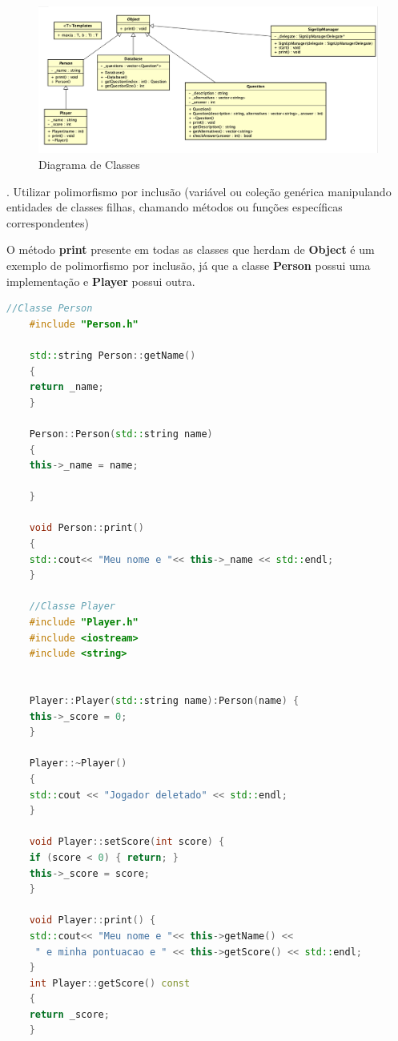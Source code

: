 \documentclass[rel_mlp]{iiufrgs}
\begin{document}
\begin{itemize}
	\begin{figure}[h!]
		\includegraphics[width=\linewidth]{dc.png}
		\caption{Diagrama de Classes}
		\label{fig:dc}
	\end{figure}
	
	. Utilizar polimorfismo por inclusão (variável ou coleção genérica manipulando entidades de classes filhas, chamando métodos ou funções específicas correspondentes)
	
	O método \textbf{print} presente em todas as classes que herdam de \textbf{Object} é um exemplo de polimorfismo por inclusão, já que a classe \textbf{Person} possui uma implementação e \textbf{Player} possui outra.
	
	\begin{lstlisting}[language=C++, caption={Exemplo de polimorfismo por inclusão}]
	//Classe Person
	#include "Person.h"
	
	std::string Person::getName()
	{
	return _name;
	}
	
	Person::Person(std::string name)
	{
	this->_name = name;
	
	}
	
	void Person::print()
	{
	std::cout<< "Meu nome e "<< this->_name << std::endl;
	}
	
	//Classe Player
	#include "Player.h"
	#include <iostream>
	#include <string>
	
	
	Player::Player(std::string name):Person(name) {
	this->_score = 0;
	}
	
	Player::~Player()
	{
	std::cout << "Jogador deletado" << std::endl;
	}
	
	void Player::setScore(int score) {
	if (score < 0) { return; }
	this->_score = score;
	}
	
	void Player::print() {
	std::cout<< "Meu nome e "<< this->getName() <<
	 " e minha pontuacao e " << this->getScore() << std::endl;
	}
	int Player::getScore() const
	{
	return _score;
	}
	
	\end{lstlisting}
	

\end{itemize}
\end{document}
